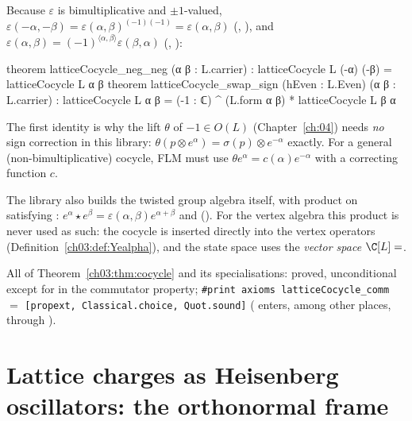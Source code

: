 \begin{remark}\label{ch03:rem:negneg}
Because $\varepsilon$ is bimultiplicative and $\pm1$-valued, $\varepsilon(-\alpha,-\beta)=
\varepsilon(\alpha,\beta)^{(-1)(-1)}=\varepsilon(\alpha,\beta)$
(, ), and
$\varepsilon(\alpha,\beta)=(-1)^{\langle\alpha,\beta\rangle}\varepsilon(\beta,\alpha)$
(, ):
\begin{leancode}
theorem latticeCocycle_neg_neg (α β : L.carrier) :
    latticeCocycle L (-α) (-β) = latticeCocycle L α β
theorem latticeCocycle_swap_sign (hEven : L.Even) (α β : L.carrier) :
    latticeCocycle L α β = (-1 : ℂ) ^ (L.form α β) * latticeCocycle L β α
\end{leancode}
The first identity is why the lift $\theta$ of $-1\in O(L)$ (Chapter~\ref{ch:04}) needs \emph{no}
sign correction in this library: $\theta(p\otimes e^\alpha)=\sigma(p)\otimes e^{-\alpha}$ exactly.
For a general (non-bimultiplicative) cocycle, FLM must use $\theta e^\alpha=c(\alpha)e^{-\alpha}$
with a correcting function $c$.
\end{remark}

The library also builds the twisted group algebra itself, with product
 on  satisfying :
$e^\alpha\star e^\beta=\varepsilon(\alpha,\beta)e^{\alpha+\beta}$ and 
(). For the vertex algebra this product is
never used as such: the cocycle is inserted directly into the vertex operators
(Definition~\ref{ch03:def:Yealpha}), and the state space uses the \emph{vector space}
$\C[L]=$.

\begin{status}
All of Theorem~\ref{ch03:thm:cocycle} and its  specialisations: proved,
unconditional except for  in the commutator property;
\texttt{\#print axioms latticeCocycle\_comm} $=$ \texttt{[propext, Classical.choice, Quot.sound]}
( enters, among other places, through ).
\end{status}

\section{Lattice charges as Heisenberg oscillators: the orthonormal frame}\label{ch03:sec:frame}

